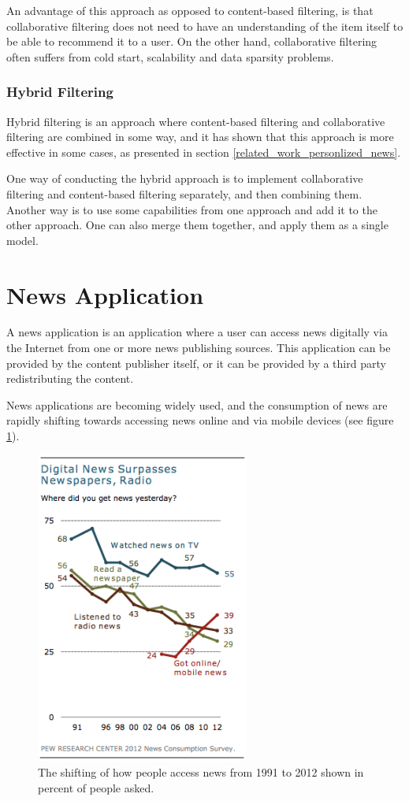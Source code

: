 An advantage of this approach as opposed to content-based filtering, is that collaborative filtering does not need to have an understanding of the item itself to be able to recommend it to a user. On the other hand, collaborative filtering often suffers from cold start\cite{lam2008addressing}, scalability and data sparsity\cite{huang2004applying} problems.

\subsubsection{Hybrid Filtering}
Hybrid filtering is an approach where content-based filtering and collaborative filtering are combined in some way, and it has shown that this approach is more effective in some cases, as presented in section \ref{related_work_personlized_news}.

One way of conducting the hybrid approach is to implement collaborative filtering and content-based filtering separately, and then combining them. Another way is to use some capabilities from one approach and add it to the other approach. One can also merge them together, and apply them as a single model.

\section{News Application}
A news application is an application where a user can access news digitally via the Internet from one or more news publishing sources. This application can be provided by the content publisher itself, or it can be provided by a third party redistributing the content.

News applications are becoming widely used, and the consumption of news are rapidly shifting towards accessing news online and via mobile devices (see figure \ref{pew_news_consumption_survey})\cite{pewresearch2012trends19912012}.

\begin{figure}[!htbp]
\centering
\includegraphics[width=70mm]{GFX/tech/pewNewsConsumptionSurvey.png}
\caption{The shifting of how people access news from 1991 to 2012 shown in percent of people asked.}
\label{pew_news_consumption_survey}
\end{figure}

